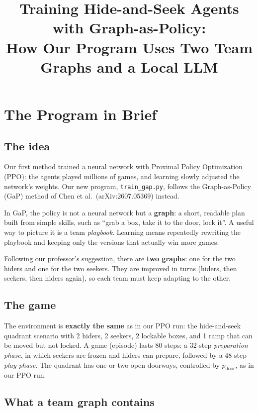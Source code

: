 \documentclass[11pt]{article}
\title{Training Hide-and-Seek Agents with Graph-as-Policy:\\
How Our Program Uses Two Team Graphs and a Local LLM}
\author{}
\date{}
\begin{document}
\maketitle

\section{The Program in Brief}

\subsection{The idea}

Our first method trained a neural network with Proximal Policy Optimization
(PPO): the agents played millions of games, and learning slowly adjusted the
network's weights. Our new program, \texttt{train\_gap.py}, follows the
Graph-as-Policy (GaP) method of Chen et al.\ (arXiv:2607.05369) instead.

In GaP, the policy is not a neural network but a \textbf{graph}: a short,
readable plan built from simple skills, such as ``grab a box, take it to the
door, lock it''. A useful way to picture it is a team \emph{playbook}. Learning
means repeatedly rewriting the playbook and keeping only the versions that
actually win more games.

Following our professor's suggestion, there are \textbf{two graphs}: one for the
two hiders and one for the two seekers. They are improved in turns (hiders, then
seekers, then hiders again), so each team must keep adapting to the other.

\subsection{The game}

The environment is \textbf{exactly the same} as in our PPO run: the
hide-and-seek quadrant scenario with 2 hiders, 2 seekers, 2 lockable boxes, and
1 ramp that can be moved but not locked. A game (episode) lasts 80 steps: a
32-step \emph{preparation phase}, in which seekers are frozen and hiders can
prepare, followed by a 48-step \emph{play phase}. The quadrant has one or two
open doorways, controlled by $p_{\text{door}}$, as in our PPO run.

\subsection{What a team graph contains}
\end{document}

